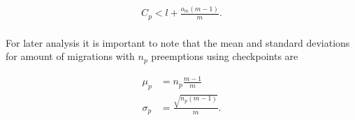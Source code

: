 \documentclass[11pt]{article}
\begin{document}
\begin{gather*}
C_{p} < l + \frac{o_{m} \left( m - 1 \right)}{m}. \\
\end{gather*} 

For later analysis it is important to note that the mean and standard deviations for amount of migrations with \(n_{p}\) preemptions using checkpoints are

\begin{align*}
\mu_{p} &= n_{p} \frac{m - 1}{m} \\
\sigma_{p} &= \frac{\sqrt{n_{p} \left( m - 1 \right)}}{m}. \\
\end{align*}
\end{document}
